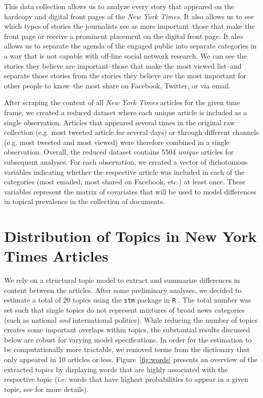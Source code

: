 \documentclass[12pt]{article}
\begin{document}
\begin{doublespace}
This data collection allows us to analyze every story that appeared on the hardcopy and digital front pages of the \textit{New York Times}. It also allows us to see which types of stories the journalists see as more important--those that make the front page or receive a prominent placement on the digital front page. It also allows us to separate the agenda of the engaged public into separate categories in a way that is not capable with off-line social network research. We can see the stories they believe are important--those that make the most viewed list--and separate those stories from the stories they believe are the most important for other people to know--the most share on Facebook, Twitter, or via email.

After scraping the content of all \textit{New York Times} articles for the given time frame, we created a reduced dataset where each unique article is included as a single observation. Articles that appeared several times in the original raw collection (e.g. most tweeted article for several days) or through different channels (e.g. most tweeted and most viewed) were therefore combined in a single observation. Overall, the reduced dataset contains 5504 \textit{unique} articles for subsequent analyses. For each observation, we created a vector of dichotomous variables indicating whether the respective article was included in each of the categories (most emailed, most shared on Facebook, etc.) at least once. These variables represent the matrix of covariates that will be used to model differences in topical prevalence in the collection of documents.


\section{Distribution of Topics in New York Times Articles}

We rely on a structural topic model to extract and summarize differences in content between the articles. After some preliminary analyses, we decided to estimate a total of 20 topics using the \texttt{stm} package in \texttt{R} \citep[using spectral initialization, see][]{roberts2014structural,roberts2014stm}. The total number was set such that single topics do not represent mixtures of broad news categories (such as national \textit{and} international politics). While reducing the number of topics creates some important overlaps within topics, the substantial results discussed below are robust for varying model specifications. In order for the estimation to be computationally more tractable, we removed terms from the dictionary that only appeared in 10 articles or less. Figure~\ref{fig:words} presents an overview of the extracted topics by displaying words that are highly associated with the respective topic (i.e. words that have highest probabilities to appear in a given topic, see \citealt{roberts2014stm} for more details).


\end{doublespace}
\end{document}
